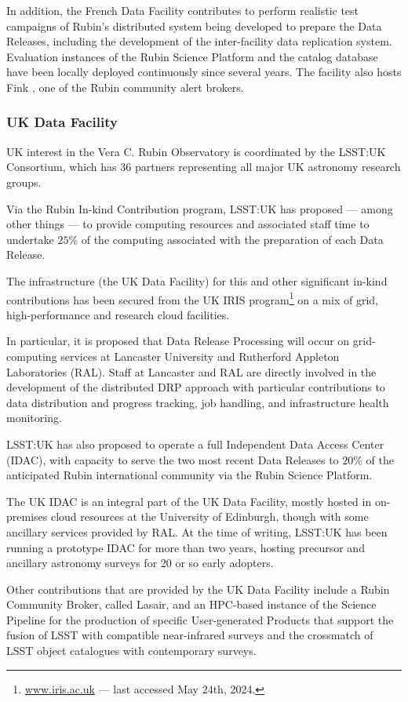 In addition, the French Data Facility contributes to perform realistic test campaigns of Rubin's distributed system being developed to prepare the Data Releases, including the development of the inter-facility data replication system. Evaluation instances of the Rubin Science Platform and the catalog database have been locally deployed continuously since several years. The facility also hosts Fink \citep{10.1093/mnras/staa3602}, one of the Rubin community alert brokers.

\subsubsection{UK Data Facility} \label{sec:ukdf}

UK interest in the Vera C. Rubin Observatory is coordinated by the LSST:UK Consortium, which has 36 partners representing all major UK astronomy research groups.

Via the Rubin In-kind Contribution program, LSST:UK has proposed --- among other things --- to provide computing resources and associated staff time to undertake $25\%$ of the computing associated with the preparation of each Data Release.

The infrastructure (the UK Data Facility) for this and other significant in-kind contributions has been secured from the UK IRIS program\footnote{\url{www.iris.ac.uk} --- last accessed May 24th, 2024.} on a mix of grid, high-performance and research cloud facilities.

In particular, it is proposed that Data Release Processing will occur on grid-computing services at Lancaster University and Rutherford Appleton Laboratories (RAL). Staff at Lancaster and RAL are directly involved in the development of the distributed DRP approach with particular contributions to data distribution and progress tracking, job handling, and infrastructure health monitoring.

LSST:UK has also proposed to operate a full Independent Data Access Center (IDAC), with capacity to serve the two most recent Data Releases to $20\%$ of the anticipated Rubin international community via the Rubin Science Platform.

The UK IDAC is an integral part of the UK Data Facility, mostly hosted in on-premises cloud resources at the University of Edinburgh, though with some ancillary services provided by RAL. At the time of writing, LSST:UK has been running a prototype IDAC for more than two years, hosting precursor and ancillary astronomy surveys for 20 or so early adopters.

Other contributions that are provided by the UK Data Facility include a Rubin Community Broker, called Lasair, and an HPC-based instance of the Science Pipeline for the production of specific User-generated Products that support the fusion of LSST with compatible near-infrared surveys and the crossmatch of LSST object catalogues with contemporary surveys.
